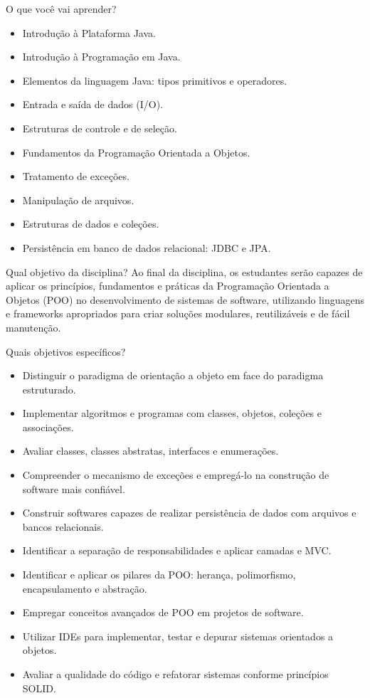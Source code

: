 \begin{frame}{O que você vai aprender?}
\small
\begin{itemize}
  \item Introdução à Plataforma Java.
  \item Introdução à Programação em Java.
  \item Elementos da linguagem Java: tipos primitivos e operadores.
  \item Entrada e saída de dados (I/O).
  \item Estruturas de controle e de seleção.
  \item Fundamentos da Programação Orientada a Objetos.
  \item Tratamento de exceções.
  \item Manipulação de arquivos.
  \item Estruturas de dados e coleções.
  \item Persistência em banco de dados relacional: JDBC e JPA.
\end{itemize}

\planreference
\end{frame}

\begin{frame}{Qual objetivo da disciplina?}
Ao final da disciplina, os estudantes serão capazes de aplicar os princípios, fundamentos e práticas da Programação Orientada a Objetos (POO) no desenvolvimento de sistemas de software, utilizando linguagens e frameworks apropriados para criar soluções modulares, reutilizáveis e de fácil manutenção.

\planreference
\end{frame}

\begin{frame}{Quais objetivos específicos?}
\scriptsize
\begin{itemize}
  \item Distinguir o paradigma de orientação a objeto em face do paradigma estruturado.
  \item Implementar algoritmos e programas com classes, objetos, coleções e associações.
  \item Avaliar classes, classes abstratas, interfaces e enumerações.
  \item Compreender o mecanismo de exceções e empregá-lo na construção de software mais confiável.
  \item Construir softwares capazes de realizar persistência de dados com arquivos e bancos relacionais.
  \item Identificar a separação de responsabilidades e aplicar camadas e MVC.
  \item Identificar e aplicar os pilares da POO: herança, polimorfismo, encapsulamento e abstração.
  \item Empregar conceitos avançados de POO em projetos de software.
  \item Utilizar IDEs para implementar, testar e depurar sistemas orientados a objetos.
  \item Avaliar a qualidade do código e refatorar sistemas conforme princípios SOLID.
\end{itemize}

\planreference
\end{frame}

